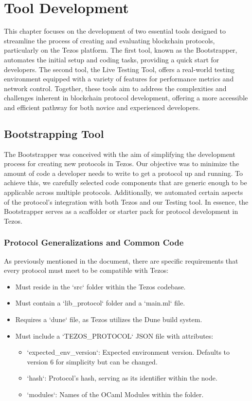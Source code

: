 \chapter{Tool Development}
This chapter focuses on the development of two essential tools designed to streamline the process of creating and evaluating blockchain protocols, particularly on the Tezos platform. The first tool, known as the Bootstrapper, automates the initial setup and coding tasks, providing a quick start for developers. The second tool, the Live Testing Tool, offers a real-world testing environment equipped with a variety of features for performance metrics and network control. Together, these tools aim to address the complexities and challenges inherent in blockchain protocol development, offering a more accessible and efficient pathway for both novice and experienced developers.


\section{Bootstrapping Tool}
The Bootstrapper was conceived with the aim of simplifying the development process for creating new protocols in Tezos. Our objective was to minimize the amount of code a developer needs to write to get a protocol up and running. To achieve this, we carefully selected code components that are generic enough to be applicable across multiple protocols. Additionally, we automated certain aspects of the protocol's integration with both Tezos and our Testing tool. In essence, the Bootstrapper serves as a scaffolder or starter pack for protocol development in Tezos.

\subsection*{Protocol Generalizations and Common Code}

As previously mentioned in the document, there are specific requirements that every protocol must meet to be compatible with Tezos:

\begin{itemize}
\item Must reside in the `src` folder within the Tezos codebase.
\item Must contain a `lib\_protocol` folder and a `main.ml` file.
\item Requires a `dune` file, as Tezos utilizes the Dune build system.
\item Must include a `TEZOS\_PROTOCOL` JSON file with attributes:
\begin{itemize}
  \item `expected\_env\_version`: Expected environment version. Defaults to version 6 for simplicity but can be changed.
  \item `hash`: Protocol's hash, serving as its identifier within the node.
  \item `modules`: Names of the OCaml Modules within the folder.
\end{itemize}

\end{itemize}


